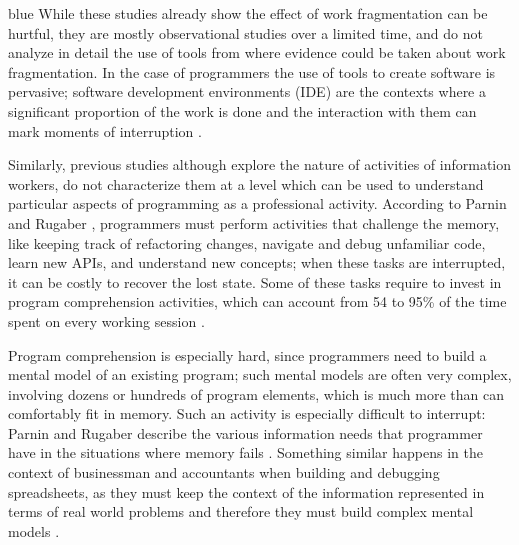 \documentclass[times]{smrauth}
\newenvironment{changedforreviewerlong}%
	{\begin{color}{blue}}%
		
		{\end{color}}
\newenvironment{changedforreviewerlong}%

{}
\newcommand\RR[1]{\textbf{Romain #1}}
\begin{document}
\begin{changedforreviewerlong}
While these studies already show the effect of work fragmentation can be hurtful, they are mostly observational studies over a limited time, and do not analyze in detail the use of tools from where evidence could be taken about work fragmentation. In the case of programmers the use of tools to create software is pervasive; software development environments (IDE) are the contexts where a significant proportion of the work is done and the interaction with them can mark moments of interruption \cite{BK16}.

Similarly, previous studies although explore the nature of activities of information workers, do not characterize them at a level which can be used to understand particular aspects of programming as a professional activity. According to Parnin and Rugaber \cite{PR12}, programmers must perform activities that challenge the memory, like keeping track of refactoring changes, navigate and debug unfamiliar code, learn new APIs, and understand new concepts; when these tasks are interrupted, it can be costly to recover the lost state. Some of these tasks require to invest in program comprehension activities, which can account from 54 to 95\% of the time spent on every working session \cite{MMLK14}. 

\end{changedforreviewerlong}
Program comprehension is especially hard, since programmers need to build a mental model of an existing program; such mental models are often very complex, involving dozens or hundreds of program elements, which is much more than can comfortably fit in memory. Such an activity is especially difficult to interrupt: Parnin and Rugaber describe the various information needs that programmer have in the situations where memory fails \cite{PR12}. Something similar happens in the context of businessman and accountants when building and debugging spreadsheets, as they must keep the context of the information represented in terms of real world problems and therefore they must build complex mental models \cite{KS13}.



\end{document}
